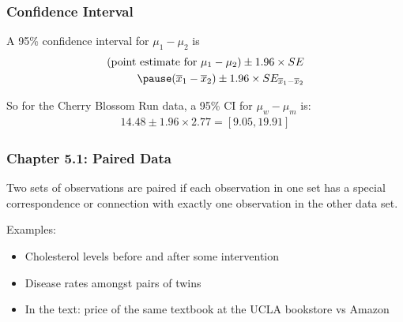 \documentclass[slides]{beamer}
\newcommand{\blue}[1]{\textcolor{blue2}{#1}}
\newcommand{\xbar}{\overline{x}}
\begin{document}
\begin{frame}[fragile]
\frametitle{Confidence Interval}

A 95\% confidence interval for $\mu_1 - \mu_2$ is
\begin{eqnarray*}
(\mbox{point estimate for } \mu_1 - \mu_2) \pm 1.96 \times SE\\
\pause(\xbar_1 - \xbar_2) \pm 1.96 \times SE_{\xbar_1 - \xbar_2}
\end{eqnarray*}

\pause So for the Cherry Blossom Run data, a 95\% CI for $\mu_w - \mu_m$ is:
\begin{eqnarray*}
14.48 \pm 1.96 \times 2.77 =  [9.05, 19.91]
\end{eqnarray*}

\end{frame}


\begin{frame}[fragile]
\frametitle{Chapter 5.1: Paired Data}
Two sets of observations are \blue{paired} if each observation in one set has a special correspondence or connection with exactly one observation in the other data set.

\vspace{0.25cm} 

\pause Examples:

\begin{itemize}
\item Cholesterol levels before and after some intervention
\pause \item Disease rates amongst pairs of twins
\pause \item In the text:  price of the same textbook at the UCLA bookstore vs Amazon
\end{itemize}

\end{frame}
\end{document}

